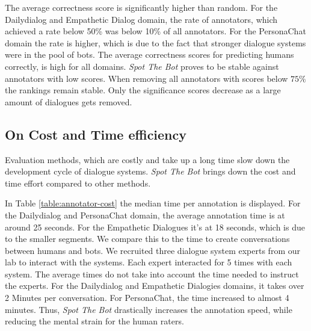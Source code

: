 \documentclass[11pt,a4paper]{article}
\begin{document}


 The average correctness score is significantly higher than random. For the Dailydialog and Empathetic Dialog domain, the rate of annotators, which achieved a rate below 50\% was below 10\% of all annotators. For the PersonaChat domain the rate is higher, which is due to the fact that stronger dialogue systems were in the pool of bots. The average correctness scores for predicting humans correctly, is high for all domains. 
\emph{Spot The Bot} proves to be stable against annotators with low scores. When removing all annotators with scores below $75\%$ the rankings remain stable. Only the significance scores decrease as a large amount of dialogues gets removed. 

\subsection{On Cost and Time efficiency}
Evaluation methods, which are costly and take up a long time slow down the development cycle of dialogue systems. \emph{Spot The Bot} brings down the cost and time effort compared to other methods. 

In Table \ref{table:annotator-cost} the median time per annotation is displayed.  For the Dailydialog and PersonaChat domain, the average annotation time is at around 25 seconds. For the Empathetic Dialogues it's at 18 seconds, which is due to the smaller segments. We compare this to the time to create conversations between humans and bots. We recruited three dialogue system experts from our lab to interact with the systems. Each expert interacted for 5 times with each system. The average times do not take into account the time needed to instruct the experts. For the Dailydialog and Empathetic Dialogies domains, it takes over 2 Minutes per conversation. For PersonaChat, the time increased to almost 4 minutes. Thus, \emph{Spot The Bot} drastically increases the annotation speed, while reducing the mental strain for the human raters.
\end{document}
